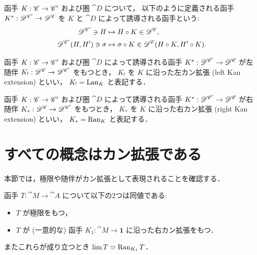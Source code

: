 \documentclass[titlepage]{ltjsreport}
\begin{document}
\begin{definition}[函手の誘導]
  \def\C{\cat{C}}%
  \def\A{\cat{C'}}%
  \def\D{\cat{D}}%
  \def\K{K}%
  \def\h{H}%
  函手 $\mrp{\K}{\C}{\A}$ および圏 $\D$ について，
  以下のように定義される函手 $\mrp{\K^*}{\D^\A}{\D^\C}$ を
  $\K$ と $\D$ によって誘導される函手という:
  \begin{align}
    \objs{\D^\A}\ni\h
     & \mapsto\h\circ\K\in\objs{\D^\C},                            \\
    \mrps{\D^\A}{\h}{\h'}\ni\sigma
     & \mapsto\sigma\circ\K\in\mrps{\D^\C}{\h\circ\K}{\h'\circ\K}.
  \end{align}
\end{definition}
\begin{definition}[左カン拡張]
  \def\C{\cat{C}}%
  \def\A{\cat{C'}}%
  \def\D{\cat{D}}%
  \def\K{K}%
  \def\L{\K_!}%
  函手 $\mrp{\K}{\C}{\A}$ および圏 $\D$ によって誘導される函手
  $\mrp{\K^*}{\D^\A}{\D^\C}$ が左随伴 $\mrp{\L}{\D^\C}{\D^\A}$ をもつとき，
  $\L$ を $\K$ に沿った左カン拡張 (left Kan extension) といい，
  $\L=\lan_{\K}$ と表記する．
\end{definition}
\begin{definition}[右カン拡張]
  \def\C{\cat{C}}%
  \def\A{\cat{C'}}%
  \def\D{\cat{D}}%
  \def\K{K}%
  \def\R{\K_*}%
  函手 $\mrp{\K}{\C}{\A}$ および圏 $\D$ によって誘導される函手
  $\mrp{\K^*}{\D^\A}{\D^\C}$ が右随伴 $\mrp{\R}{\D^\C}{\D^\A}$ をもつとき，
  $\R$ を $\K$ に沿った右カン拡張 (right Kan extension) といい，
  $\R=\ran_{\K}$ と表記する．
\end{definition}
\begin{center}
  
  \hspace{20pt}
  
\end{center}

\section{すべての概念はカン拡張である}

本節では，極限や随伴がカン拡張として表現されることを確認する．

\begin{theorem}[極限は右カン拡張である]\label{thm:limit-is-right-kan-extension}
  函手 $T:\cat{M}\to\cat{A}$ について以下の2つは同値である:
  \begin{itemize}
    \item $T$ が極限をもつ，
    \item $T$ が (一意的な) 函手 $K_1:\cat{M}\to\mathbf{1}$
          に沿った右カン拡張をもつ．
  \end{itemize}
  またこれらが成り立つとき $\lim T\simeq\operatorname{Ran}_{K_1}T$．
\end{theorem}
\end{document}
